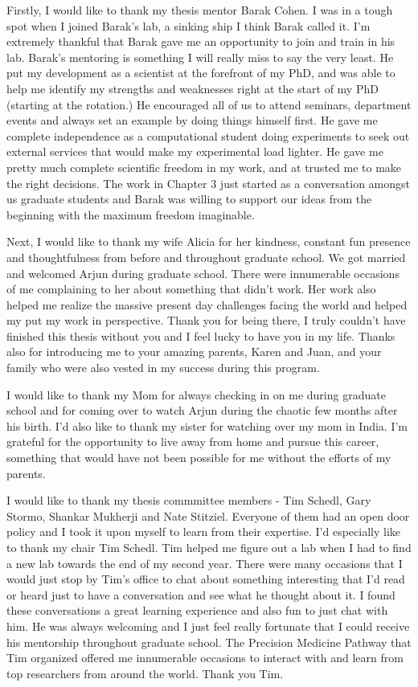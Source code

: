 \thesisacknowledgments

Firstly, I would like to thank my thesis mentor Barak Cohen. I was in a tough spot when I joined Barak's lab, a sinking ship I think Barak called it. I'm extremely thankful that Barak gave me an opportunity to join and train in his lab. Barak's mentoring is something I will really miss to say the very least. He put my development as a scientist at the forefront of my PhD, and was able to help me identify my strengths and weaknesses right at the start of my PhD (starting at the rotation.) He encouraged all of us to attend seminars, department events and always set an example by doing things himself first. He gave me complete independence as a computational student doing experiments to seek out external services that would make my experimental load lighter. He gave me pretty much complete scientific freedom in my work, and at trusted me to make the right decisions. The work in Chapter 3 just started as a conversation amongst us graduate students and Barak was willing to support our ideas from the beginning with the maximum freedom imaginable.

Next, I would like to thank my wife Alicia for her kindness, constant fun presence and thoughtfulness from before and throughout graduate school. We got married and welcomed Arjun during graduate school. There were innumerable occasions of me complaining to her about something that didn't work. Her work also helped me realize the massive present day challenges facing the world and helped my put my work in perspective. Thank you for being there, I truly couldn't have finished this thesis without you and I feel lucky to have you in my life. Thanks also for introducing me to your amazing parents, Karen and Juan, and your family who were also vested in my success during this program.

I would like to thank my Mom for always checking in on me during graduate school and for coming over to watch Arjun during the chaotic few months after his birth. I'd also like to thank my sister for watching over my mom in India. I'm grateful for the opportunity to live away from home and pursue this career, something that would have not been possible for me without the efforts of my parents.

I would like to thank  my thesis commmittee members - Tim Schedl, Gary Stormo, Shankar Mukherji and Nate Stitziel. Everyone of them had an open door policy and I took it upon myself to learn from their expertise. I'd especially like to thank my chair Tim Schedl. Tim helped me figure out a lab when I had to find a new lab towards the end of my second year. There were many occasions that I would just stop by Tim's office to chat about something interesting that I'd read or heard just to have a conversation and see what he thought about it. I found these conversations a great learning experience and also fun to just chat with him. He was always welcoming and I just feel really fortunate that I could receive his mentorship throughout graduate school. The Precision Medicine Pathway that Tim organized offered me innumerable occasions to interact with and learn from top researchers from around the world. Thank you Tim.

